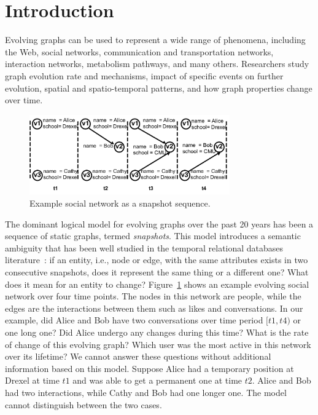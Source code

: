 \section{Introduction}
\label{sec:intro}

Evolving graphs can be used to represent a wide range of phenomena,
including the Web, social networks, communication and transportation
networks, interaction networks, metabolism pathways, and many others.
Researchers study graph evolution rate and mechanisms, impact of
specific events on further evolution, spatial and spatio-temporal
patterns, and how graph properties change over time.  

\begin{figure}[b]
\includegraphics[width=3.4in]{figs/T1_graphs.pdf}
\vspace{-0.5cm}
\caption{Example social network as a snapshot sequence.}
\label{fig:snapshots}
\end{figure}

The dominant logical model for evolving graphs over the past 20 years
has been a sequence of static graphs, termed {\em snapshots}.  This
model introduces a semantic ambiguity that has been well studied in
the temporal relational databases literature~\cite{Bohlen1998}: if an
entity, i.e., node or edge, with the same attributes exists in two
consecutive snapshots, does it represent the same thing or a different
one?  What does it mean for an entity to change?
Figure~\ref{fig:snapshots} shows an example evolving social network
over four time points.  The nodes in this network are people, while
the edges are the interactions between them such as likes and
conversations.  In our example, did Alice and Bob have two
conversations over time period $[t1, t4)$ or one long one?  Did Alice
  undergo any changes during this time?  What is the rate of change of
  this evolving graph?  Which user was the most active in this network
  over its lifetime?  We cannot answer these questions without
  additional information based on this model.  Suppose Alice had a
  temporary position at Drexel at time $t1$ and was able to get a
  permanent one at time $t2$.  Alice and Bob had two interactions,
  while Cathy and Bob had one longer one.  The model cannot
  distinguish between the two cases.

